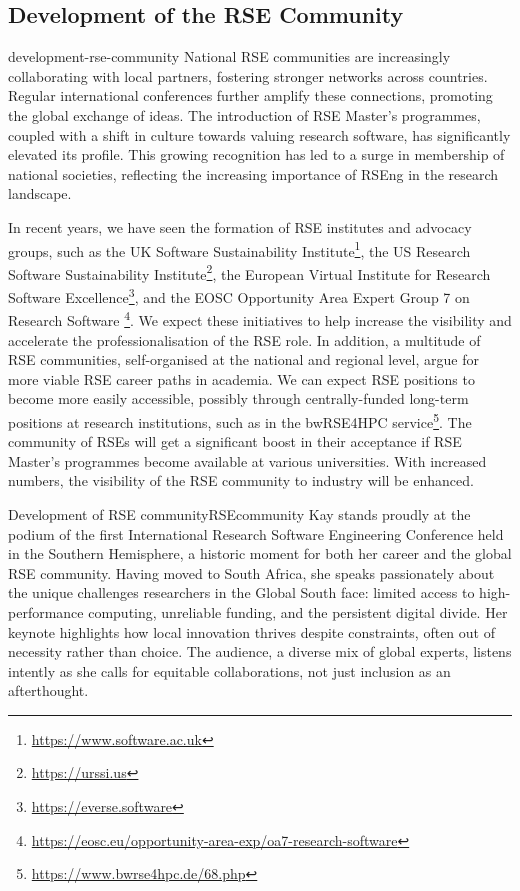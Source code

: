 \documentclass{eceasst}
\begin{document}
\subsection{Development of the RSE Community}
\begin{whatis}{}{development-rse-community}
National RSE communities are increasingly collaborating with local partners,
fostering stronger networks across countries.
Regular international conferences further amplify these connections,
promoting the global exchange of ideas. The introduction of RSE Master's programmes,
coupled with a shift in culture towards valuing research software,
has significantly elevated its profile.
This growing recognition has led to a surge in membership of national societies,
reflecting the increasing importance of RSEng in the research landscape.
\end{whatis}
In recent years, we have seen the formation of RSE institutes and advocacy groups, such as
the UK Software Sustainability Institute\footnote{\url{https://www.software.ac.uk}},
the US Research Software Sustainability Institute\footnote{\url{https://urssi.us}},
the European Virtual Institute for Research Software Excellence\footnote{\url{https://everse.software}},
and the EOSC Opportunity Area Expert Group 7 on Research Software%
\footnote{\url{https://eosc.eu/opportunity-area-exp/oa7-research-software}}.
We expect these initiatives to help increase the visibility and accelerate
the professionalisation of the RSE role.
In addition, a multitude of RSE communities, self-organised at the national
and regional level, argue for more viable RSE career paths in academia.
We can expect RSE positions to become more easily accessible,
possibly through centrally-funded long-term positions at research institutions,
such as in the bwRSE4HPC service\footnote{\url{https://www.bwrse4hpc.de/68.php}}.
The community of RSEs will get a significant boost in their acceptance
if RSE Master's programmes become available at various universities.
With increased numbers, the visibility of the RSE community to industry will be enhanced.
\begin{story}{Development of RSE community}{RSEcommunity}
Kay stands proudly at the podium of the first International Research
Software Engineering Conference held in the Southern Hemisphere,
a historic moment for both her career and the global RSE community.
Having moved to South Africa, she speaks passionately about the unique
challenges researchers in the Global South face: limited access
to high-performance computing, unreliable funding,
and the persistent digital divide.
Her keynote highlights how local innovation thrives despite constraints,
often out of necessity rather than choice.
The audience, a diverse mix of global experts, listens intently as she calls
for equitable collaborations, not just inclusion as an afterthought.
\end{story}
\end{document}
